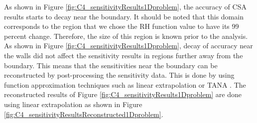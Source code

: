 %
As shown in Figure \ref{fig:C4_sensitivityResults1Dproblem}, the accuracy of CSA results starts to decay near the boundary. It should be noted that this domain corresponds to the region that we chose the RH function value to have its 99 percent change. Therefore, the size of this region is known prior to the analysis. As shown in Figure \ref{fig:C4_sensitivityResults1Dproblem}, decay of accuracy near the walls did not affect the sensitivity results in regions further away from the boundary. This means that the sensitivities near the boundary can be reconstructed by post-processing the sensitivity data. This is done by using function approximation techniques such as linear extrapolation or TANA \cite{wang1995improved}. The reconstructed results of Figure \ref{fig:C4_sensitivityResults1Dproblem} are done using linear extrapolation as shown in Figure \ref{fig:C4_sensitivityResultsReconstructed1Dproblem}.
%
